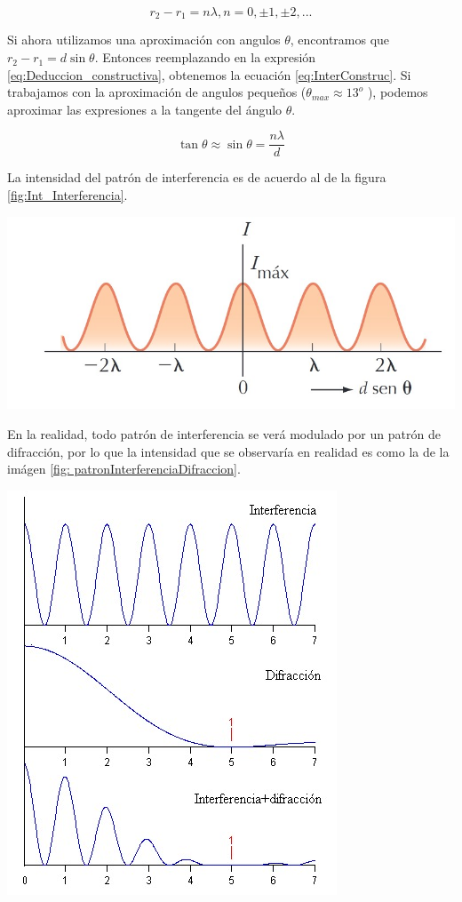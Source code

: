 \documentclass[a4paper,12pt]{article}
\newenvironment{Figure}
  {\par\medskip\noindent\minipage{\linewidth}}
  {\endminipage\par\medskip}
\begin{document}
    \begin{equation}
        r_2 - r_1 =  n\lambda, n=0,\pm1, \pm2,...
        \label{eq:Deduccion_constructiva}
    \end{equation}

    Si ahora utilizamos una aproximación con angulos $\theta$, encontramos que $ r_2 - r_1 = d \sin\theta $. Entonces reemplazando en la expresión \ref{eq:Deduccion_constructiva}, obtenemos la ecuación \ref{eq:InterConstruc}. Si trabajamos con la aproximación de angulos pequeños ($\theta_{max} \approx 13^o$ ), podemos aproximar las expresiones a la tangente del ángulo $\theta$.

    \begin{equation}
        \tan \theta \approx \sin \theta =  \frac{n\lambda}{d}
        \label{eq:InterConstruc}
    \end{equation}

    La intensidad del patrón de interferencia es de acuerdo al de la figura \ref{fig:Int_Interferencia}.

    \begin{Figure}
        \centering
        \includegraphics[width=0.75\linewidth]{Intensidad_interferencia.jpg}
        \label{fig:Int_Interferencia}
    \end{Figure}

    En la realidad, todo patrón de interferencia se verá modulado por un patrón de difracción, por lo que la intensidad que se observaría en realidad es como la de la imágen \ref{fig: patronInterferenciaDifraccion}.

    \begin{Figure}
        \centering
        \includegraphics[width=0.5\linewidth]{patronInterferenciaDifraccion.jpg}
        \label{fig: patronInterferenciaDifraccion}
    \end{Figure}
\end{document}
